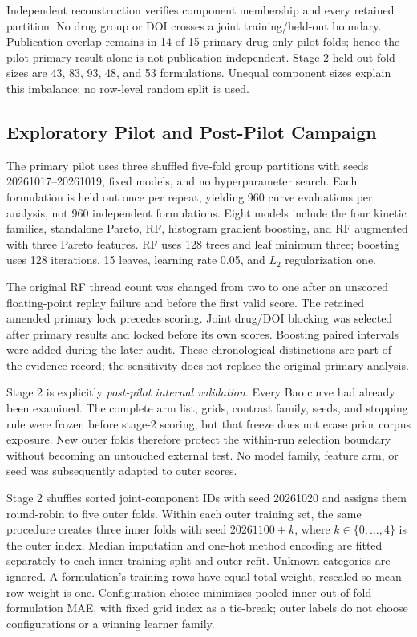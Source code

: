 \documentclass[conference,letterpaper]{IEEEtran}
\begin{document}
Independent reconstruction verifies component membership and every retained partition. No drug group or DOI crosses a joint training/held-out boundary. Publication overlap remains in 14 of 15 primary drug-only pilot folds; hence the pilot primary result alone is not publication-independent. Stage-2 held-out fold sizes are 43, 83, 93, 48, and 53 formulations. Unequal component sizes explain this imbalance; no row-level random split is used.

\subsection{Exploratory Pilot and Post-Pilot Campaign}
The primary pilot uses three shuffled five-fold group partitions with seeds 20261017--20261019, fixed models, and no hyperparameter search. Each formulation is held out once per repeat, yielding 960 curve evaluations per analysis, not 960 independent formulations. Eight models include the four kinetic families, standalone Pareto, RF, histogram gradient boosting, and RF augmented with three Pareto features. RF uses 128 trees and leaf minimum three; boosting uses 128 iterations, 15 leaves, learning rate 0.05, and $L_2$ regularization one.

The original RF thread count was changed from two to one after an unscored floating-point replay failure and before the first valid score. The retained amended primary lock precedes scoring. Joint drug/DOI blocking was selected after primary results and locked before its own scores. Boosting paired intervals were added during the later audit. These chronological distinctions are part of the evidence record; the sensitivity does not replace the original primary analysis.

Stage 2 is explicitly \emph{post-pilot internal validation}. Every Bao curve had already been examined. The complete arm list, grids, contrast family, seeds, and stopping rule were frozen before stage-2 scoring, but that freeze does not erase prior corpus exposure. New outer folds therefore protect the within-run selection boundary without becoming an untouched external test. No model family, feature arm, or seed was subsequently adapted to outer scores.

Stage 2 shuffles sorted joint-component IDs with seed 20261020 and assigns them round-robin to five outer folds. Within each outer training set, the same procedure creates three inner folds with seed $20261100+k$, where $k\in\{0,\ldots,4\}$ is the outer index. Median imputation and one-hot method encoding are fitted separately to each inner training split and outer refit. Unknown categories are ignored. A formulation's training rows have equal total weight, rescaled so mean row weight is one. Configuration choice minimizes pooled inner out-of-fold formulation MAE, with fixed grid index as a tie-break; outer labels do not choose configurations or a winning learner family.
\end{document}
